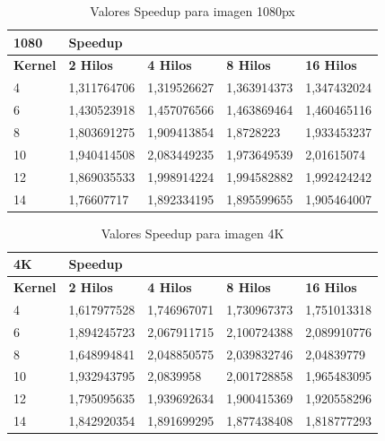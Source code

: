 \documentclass{IEEEtran}
\begin{document}
\begin{table}[h]
\begin{tabular}{lllll}
\hline
1080            & Speedup          &                  &                  &                   \\ \hline
\textbf{Kernel} & \textbf{2 Hilos} & \textbf{4 Hilos} & \textbf{8 Hilos} & \textbf{16 Hilos} \\
4               & 1,311764706      & 1,319526627      & 1,363914373      & 1,347432024       \\
6               & 1,430523918      & 1,457076566      & 1,463869464      & 1,460465116       \\
8               & 1,803691275      & 1,909413854      & 1,8728223        & 1,933453237       \\
10              & 1,940414508      & 2,083449235      & 1,973649539      & 2,01615074        \\
12              & 1,869035533      & 1,998914224      & 1,994582882      & 1,992424242       \\
14              & 1,76607717       & 1,892334195      & 1,895599655      & 1,905464007       \\ \hline
\end{tabular}
\caption{Valores Speedup para imagen 1080px}
\end{table}

\begin{table}[h]
\begin{tabular}{lllll}
\hline
4K              & Speedup          &                  &                  &                   \\ \hline
\textbf{Kernel} & \textbf{2 Hilos} & \textbf{4 Hilos} & \textbf{8 Hilos} & \textbf{16 Hilos} \\
4               & 1,617977528      & 1,746967071      & 1,730967373      & 1,751013318       \\
6               & 1,894245723      & 2,067911715      & 2,100724388      & 2,089910776       \\
8               & 1,648994841      & 2,048850575      & 2,039832746      & 2,04839779        \\
10              & 1,932943795      & 2,0839958        & 2,001728858      & 1,965483095       \\
12              & 1,795095635      & 1,939692634      & 1,900415369      & 1,920558296       \\
14              & 1,842920354      & 1,891699295      & 1,877438408      & 1,818777293       \\ \hline
\end{tabular}
\caption{Valores Speedup para imagen 4K}
\end{table}
\end{document}
